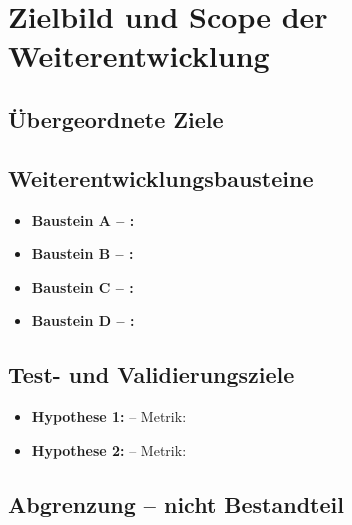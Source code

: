 \chapter{Zielbild und Scope der Weiterentwicklung}

\section{Übergeordnete Ziele}


\section{Weiterentwicklungsbausteine}

\begin{itemize}
  \item \textbf{Baustein A – :} 
  \item \textbf{Baustein B – :} 
  \item \textbf{Baustein C – :} 
  \item \textbf{Baustein D – :} 
\end{itemize}

\section{Test- und Validierungsziele}

\begin{itemize}
  \item \textbf{Hypothese 1:}  – Metrik: 
  \item \textbf{Hypothese 2:}  – Metrik: 
\end{itemize}

\section{Abgrenzung – nicht Bestandteil}

